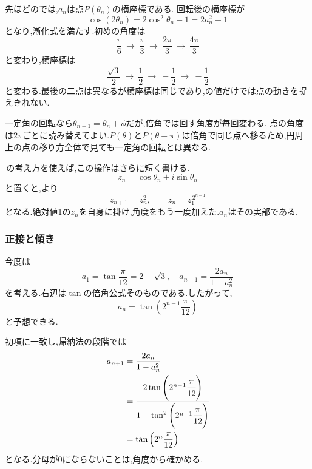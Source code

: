 \begin{center}
\end{center}

先ほどのでは,$a_n$は点$P(\theta_n)$の横座標である.
回転後の横座標が
\[
  \cos(2\theta_n)=2\cos^2\theta_n-1=2a_n^2-1
\]
となり,漸化式を満たす.初めの角度は
\[
  \frac{\pi}{6}\ \longrightarrow\ \frac{\pi}{3}
  \ \longrightarrow\ \frac{2\pi}{3}
  \ \longrightarrow\ \frac{4\pi}{3}
\]
と変わり,横座標は
\[
  \frac{\sqrt{3}}{2}\ \longrightarrow\ \frac12
  \ \longrightarrow\ -\frac12
  \ \longrightarrow\ -\frac12
\]
と変わる.最後の二点は異なるが横座標は同じであり,の値だけでは点の動きを捉えきれない.

一定角の回転なら$\theta_{n+1}=\theta_n+\phi$だが,倍角では回す角度が毎回変わる.
点の角度は$2\pi$ごとに読み替えてよい.$P(\theta)$と$P(\theta+\pi)$は倍角で同じ点へ移るため,円周上の点の移り方全体で見ても一定角の回転とは異なる.

\,の考え方を使えば,この操作はさらに短く書ける.
\[
  z_n=\cos\theta_n+i\sin\theta_n
\]
と置くと,より
\[
  z_{n+1}=z_n^2,\qquad z_n=z_1^{\,2^{n-1}}
\]
となる.絶対値1の$z_n$を自身に掛け,角度をもう一度加えた.$a_n$はその実部である.

\subsubsection{正接と傾き}\label{節：正接と傾き}
今度は
\[
  a_1=\tan\frac{\pi}{12}=2-\sqrt{3},
  \quad
  a_{n+1}=\frac{2a_n}{1-a_n^2}
\]
を考える.右辺は$\tan$の倍角公式そのものである.したがって,
\[
  a_n=\tan\left(2^{n-1}\frac{\pi}{12}\right)
\]
と予想できる.

初項に一致し,帰納法の段階では
\begin{align*}
  a_{n+1}
  &=\frac{2a_n}{1-a_n^2}\\
  &=\cfrac{2\tan\left(2^{n-1}\cfrac{\pi}{12}\right)}
  {1-\tan^2\left(2^{n-1}\cfrac{\pi}{12}\right)}\\
  &=\tan\left(2^n\frac{\pi}{12}\right)
\end{align*}
となる.分母が0にならないことは,角度から確かめる.


